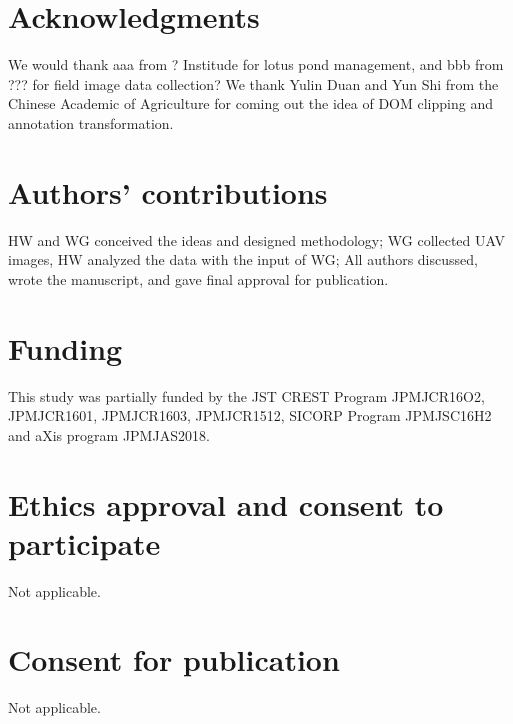 \documentclass[doublespacing]{configs/bmcart}
\begin{document}


\begin{backmatter}

\renewcommand*{\glsgroupskip}{}
\printglossary[type=\acronymtype, title=Abbreviations, nonumberlist]

\section*{Acknowledgments}
We would thank aaa from ? Institude for lotus pond management, and bbb from ??? for field image data collection? We thank Yulin Duan and Yun Shi from the Chinese Academic of Agriculture for coming out the idea of DOM clipping and annotation transformation.

\section*{Authors' contributions}
HW and WG conceived the ideas and designed methodology; WG collected UAV images, HW analyzed the data with the input of WG; All authors discussed, wrote the manuscript, and gave final approval for publication.


\section*{Funding}
This study was partially funded by the JST CREST Program JPMJCR16O2, JPMJCR1601, JPMJCR1603, JPMJCR1512, SICORP Program JPMJSC16H2 and aXis program JPMJAS2018.

\section*{Ethics approval and consent to participate}
Not applicable.

\section*{Consent for publication}
Not applicable.


\end{backmatter}
\end{document}
